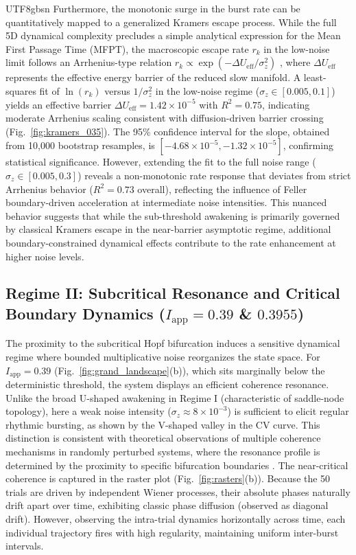 ﻿\documentclass[reprint, amsmath, amssymb, aps, pre]{revtex4-2}
\begin{document}
\begin{CJK*}{UTF8}{gbsn}
Furthermore, the monotonic surge in the burst rate can be quantitatively mapped to a generalized Kramers escape process. While the full 5D dynamical complexity precludes a simple analytical expression for the Mean First Passage Time (MFPT), the macroscopic escape rate $r_k$ in the low-noise limit follows an Arrhenius-type relation $r_k \propto \exp(-\Delta U_{\mathrm{eff}} / \sigma_z^2)$ \cite{hanggi1990reaction}, where $\Delta U_{\mathrm{eff}}$ represents the effective energy barrier of the reduced slow manifold. A least-squares fit of $\ln(r_k)$ versus $1/\sigma_z^2$ in the low-noise regime ($\sigma_z \in [0.005, 0.1]$) yields an effective barrier $\Delta U_{\mathrm{eff}} = 1.42 \times 10^{-5}$ with $R^2 = 0.75$, indicating moderate Arrhenius scaling consistent with diffusion-driven barrier crossing (Fig.~\ref{fig:kramers_035}). The 95\% confidence interval for the slope, obtained from 10,000 bootstrap resamples, is $[-4.68 \times 10^{-5}, -1.32 \times 10^{-5}]$, confirming statistical significance. However, extending the fit to the full noise range ($\sigma_z \in [0.005, 0.3]$) reveals a non-monotonic rate response that deviates from strict Arrhenius behavior ($R^2 = 0.73$ overall), reflecting the influence of Feller boundary-driven acceleration at intermediate noise intensities. This nuanced behavior suggests that while the sub-threshold awakening is primarily governed by classical Kramers escape in the near-barrier asymptotic regime, additional boundary-constrained dynamical effects contribute to the rate enhancement at higher noise levels.

\subsection{Regime II: Subcritical Resonance and Critical Boundary Dynamics ($I_{\mathrm{app}} = 0.39$ \& $0.3955$)}

The proximity to the subcritical Hopf bifurcation induces a sensitive dynamical regime where bounded multiplicative noise reorganizes the state space. For $I_{\mathrm{app}} = 0.39$ (Fig.~\ref{fig:grand_landscape}(b)), which sits marginally below the deterministic threshold, the system displays an efficient coherence resonance. Unlike the broad U-shaped awakening in Regime I (characteristic of saddle-node topology), here a weak noise intensity ($\sigma_z \approx 8 \times 10^{-3}$) is sufficient to elicit regular rhythmic bursting, as shown by the V-shaped valley in the CV curve. This distinction is consistent with theoretical observations of multiple coherence mechanisms in randomly perturbed systems, where the resonance profile is determined by the proximity to specific bifurcation boundaries \cite{deville2005transitions}. The near-critical coherence is captured in the raster plot (Fig.~\ref{fig:rasters}(b)). Because the 50 trials are driven by independent Wiener processes, their absolute phases naturally drift apart over time, exhibiting classic phase diffusion (observed as diagonal drift). However, observing the intra-trial dynamics horizontally across time, each individual trajectory fires with high regularity, maintaining uniform inter-burst intervals. 


\end{CJK*}
\end{document}
